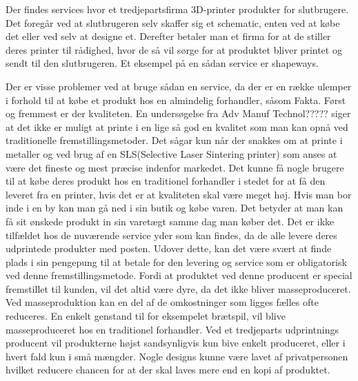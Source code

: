 Der findes services hvor et tredjepartsfirma 3D-printer produkter for slutbrugere. Det foregår ved at slutbrugeren selv skaffer sig et schematic, enten ved at købe det eller ved selv at designe et. Derefter betaler man et firma for at de stiller deres printer til rådighed, hvor de så vil sørge for at produktet bliver printet og sendt til den slutbrugeren. Et eksempel på en sådan service er shapeways. \autocite{_shapeways_????}

Der er visse problemer ved at bruge sådan en service, da der er en række ulemper i forhold til at købe et produkt hos en almindelig forhandler, såsom Fakta. Først og fremmest er der kvaliteten. En undersøgelse fra Adv Manuf Technol????? siger at det ikke er muligt at printe i en lige så god en kvalitet som man kan opnå ved traditionelle fremstillingsmetoder. Det sågar kun når der snakkes om at printe i metaller og ved brug af en SLS(Selective Laser Sintering printer) som anses at være det fineste og mest præcise indenfor markedet. Det kunne få nogle brugere til at købe deres produkt hos en traditionel forhandler i stedet for at få den leveret fra en printer, hvis det er at kvaliteten skal være meget høj.
Hvis man bor inde i en by kan man gå ned i sin butik og købe varen. Det betyder at man kan få sit ønskede produkt in sin varetægt samme dag man køber det. Det er ikke tilfældet hos de nuværende service yder som kan findes, da de alle levere deres udprintede produkter med posten.
Udover dette, kan det være svært at finde plads i sin pengepung til at betale for den levering og service som er obligatorisk ved denne fremstillingsmetode. Fordi at produktet ved denne producent er special fremstillet til kunden, vil det altid være dyre, da det ikke bliver masseproduceret. Ved masseproduktion kan en del af de omkostninger som ligges fælles ofte reduceres. En enkelt genstand til for eksempelet brætspil, vil blive masseproduceret hos en traditionel forhandler. Ved et tredjeparts udprintnings producent vil produkterne højst sandsynligvis kun bive enkelt produceret, eller i hvert fald kun i små mængder. Nogle designs kunne være lavet af privatpersonen hvilket reducere chancen for at der skal laves mere end en kopi af produktet.